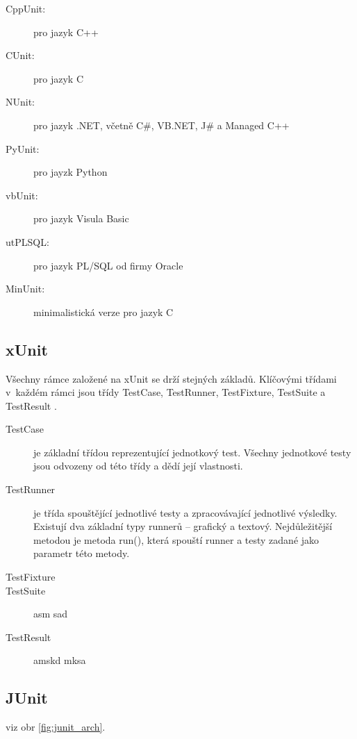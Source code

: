   \begin{description}
   \item[CppUnit:] pro jazyk C++
   \item[CUnit:] pro jazyk C
   \item[NUnit:] pro jazyk .NET, včetně C\#, VB.NET, J\# a Managed C++
   \item[PyUnit:] pro jayzk Python
   \item[vbUnit:] pro jazyk Visula Basic
   \item[utPLSQL:] pro jazyk PL/SQL od firmy Oracle
   \item[MinUnit:] minimalistická verze pro jazyk C
  \end{description}


    \subsection{xUnit}
    Všechny rámce založené na xUnit se drží stejných základů. Klíčovými třídami v~každém rámci jsou třídy TestCase, TestRunner, TestFixture, TestSuite a TestResult \cite{UnitTestFrameworks}.

    \begin{description}
      \item[TestCase] je základní třídou reprezentující jednotkový test. Všechny jednotkové testy jsou odvozeny od této třídy a dědí její vlastnosti.
      \item[TestRunner] je třída spouštějící jednotlivé testy a zpracovávající jednotlivé výsledky. Existují dva základní typy runnerů -- grafický a textový. Nejdůležitější metodou je metoda run(), která spouští runner a testy zadané jako parametr této metody.
      \item[TestFixture] 
      \item[TestSuite] asm sad 
      \item[TestResult] amskd mksa 
    \end{description}


    \subsection{JUnit}
     viz obr \ref{fig:junit_arch}.

    
